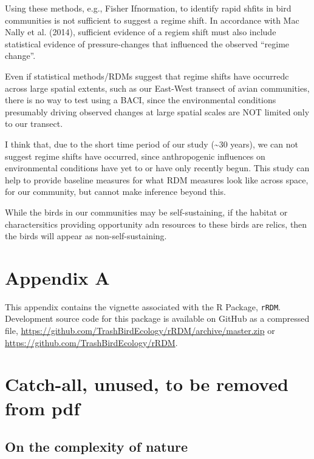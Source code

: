 \documentclass[12pt,twoside,openany]{reedthesis}
\begin{document}
Using these methods, e.g., Fisher Ifnormation, to identify rapid shfits
in bird communities is not sufficient to suggest a regime shift. In
accordance with Mac Nally et al. (2014), sufficient evidence of a regiem
shift must also include statistical evidence of pressure-changes that
influenced the observed ``regime change''.

Even if statistical methods/RDMs suggest that regime shifts have
occurredc across large spatial extents, such as our East-West transect
of avian communities, there is no way to test using a BACI, since the
environmental conditions presumably driving observed changes at large
spatial scales are NOT limited only to our transect.

I think that, due to the short time period of our study
(\textasciitilde{}30 years), we can not suggest regime shifts have
occurred, since anthropogenic influences on environmental conditions
have yet to or have only recently begun. This study can help to provide
baseline measures for what RDM measures look like across space, for our
community, but cannot make inference beyond this.

While the birds in our communities may be self-sustaining, if the
habitat or charactersitics providing opportunity adn resources to these
birds are relics, then the birds will appear as non-self-sustaining.

\appendix

\chapter*{Appendix A}\label{rRDM}

This appendix contains the vignette associated with the R Package,
\texttt{rRDM}. Development source code for this package is available on
GitHub as a compressed file,
\url{https://github.com/TrashBirdEcology/rRDM/archive/master.zip} or
\url{https://github.com/TrashBirdEcology/rRDM}.

\chapter*{Catch-all, unused, to be removed from
pdf}\label{catch-all-unused-to-be-removed-from-pdf}

\section{On the complexity of nature}\label{on-the-complexity-of-nature}
\end{document}
